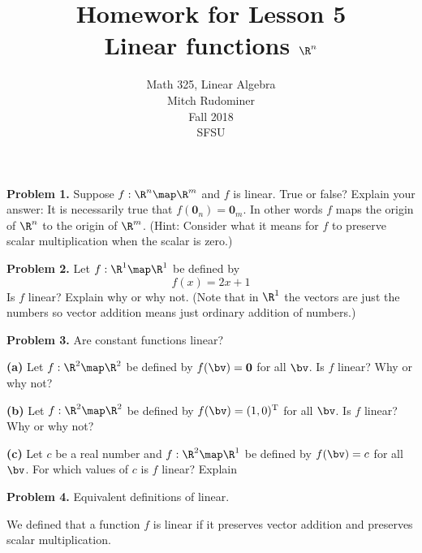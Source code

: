 \documentclass[oneside,12pt]{amsart}
\begin{document}
\title{Homework for Lesson 5 \\ Linear functions $\R^n$}
\author{Math 325, Linear Algebra \\ Mitch Rudominer \\ Fall 2018 \\ SFSU }
\date{}

\maketitle

\textbf{Problem 1.} Suppose $f:\R^n\map\R^m$ and $f$ is linear.
True or false? Explain your answer:
It is necessarily true that $f(\mathbf{0}_n) = \mathbf{0}_m$.
In other words $f$ maps the origin of $\R^n$ to the origin of $\R^m$.
(Hint: Consider what it means for $f$ to preserve scalar multiplication when
the scalar is zero.)

\bigskip
\bigskip
\bigskip
\bigskip
\bigskip
\bigskip

\textbf{Problem 2.} Let $f:\R^1\map\R^1$ be defined by
$$f(x) = 2x+1$$
Is $f$ linear? Explain why or why not. (Note that in $\R^1$ the vectors are
just the numbers so vector addition means just ordinary addition of numbers.)

\bigskip
\bigskip
\bigskip
\bigskip
\bigskip
\bigskip

\textbf{Problem 3.} Are constant functions linear?

\smallskip

\textbf{(a)} Let $f:\R^{2}\map\R^2$ be defined by $f(\bv) = \textbf{0}$ for
all $\bv$. Is $f$ linear? Why or why not?

\bigskip
\bigskip
\bigskip
\bigskip
\bigskip
\bigskip

\textbf{(b)} Let $f:\R^{2}\map\R^2$ be defined by $f(\bv) = (1,0)^{\text{T}}$ for
all $\bv$. Is $f$ linear? Why or why not?

\bigskip
\bigskip
\bigskip
\bigskip
\bigskip
\bigskip

\textbf{(c)} Let $c$ be a real number and
$f:\R^{2}\map\R^1$ be defined by $f(\bv) = c$ for
all $\bv$. For which values of $c$ is $f$ linear? Explain

\bigskip
\bigskip
\bigskip
\bigskip
\bigskip
\bigskip

\textbf{Problem 4.} Equivalent definitions of linear.

\smallskip

We defined
that a function $f$ is linear if it preserves vector addition and
preserves scalar multiplication.
\end{document}
